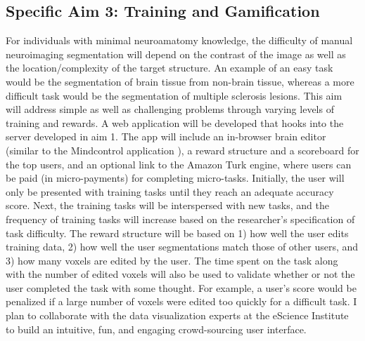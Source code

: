 

\subsection*{Specific Aim 3: Training and Gamification}

For individuals with minimal neuroamatomy knowledge, the difficulty of manual neuroimaging segmentation will depend on the contrast of the image as well as the location/complexity of the target structure. An example of an easy task would be the segmentation of brain tissue from non-brain tissue, whereas a more difficult task would be the segmentation of multiple sclerosis lesions. This aim will address simple as well as challenging problems through varying levels of training and rewards. A web application will be developed that hooks into the server developed in aim 1. The app will include an in-browser brain editor (similar to the Mindcontrol application \cite{keshavan2016mindcontrol}), a reward structure and a scoreboard for the top users, and an optional link to the Amazon Turk engine, where users can be paid (in micro-payments) for completing micro-tasks. Initially, the user will only be presented with training tasks until they reach an adequate accuracy score. Next, the training tasks will be interspersed with new tasks, and the frequency of training tasks will increase based on the researcher's specification of task difficulty. The reward structure will be based on 1) how well the user edits training data, 2) how well the user segmentations match those of other users, and 3) how many voxels are edited by the user. The time spent on the task along with the number of edited voxels will also be used to validate whether or not the user completed the task with some thought. For example, a user's score would be penalized if a large number of voxels were edited too quickly for a difficult task. I plan to collaborate with the data visualization experts at the eScience Institute to build an intuitive, fun, and engaging crowd-sourcing user interface.